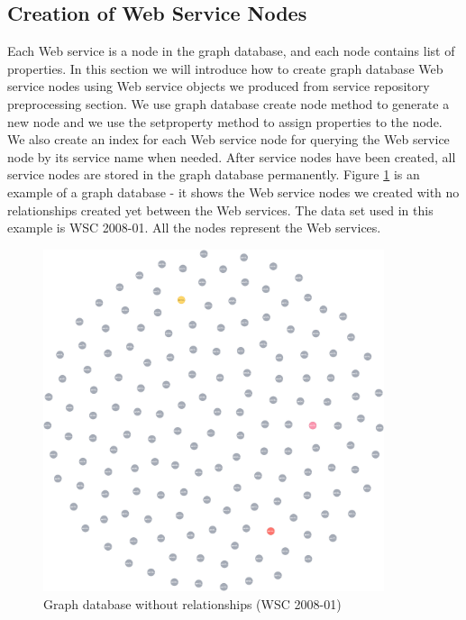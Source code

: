 \subsection{Creation of Web Service Nodes}
Each Web service is a node in the graph database, and each node contains list of properties. In this section we will introduce how to create graph database Web service nodes using Web service objects we produced from service repository preprocessing section. We use graph database create node method to generate a new node and we use the setproperty method to assign properties to the node. We also create an index for each Web service node for querying the Web service node by its service name when needed. After service nodes have been created, all service nodes are stored in the graph database permanently.  Figure \ref{fig:noRelationships} is an example of a graph database - it shows the Web service nodes we created with no relationships created yet between the Web services. The data set used in this example is WSC 2008-01. All the nodes represent the Web services. 
\begin{figure}[H]
\includegraphics[width=10cm]{service-without-relationships.png}
\centering
\caption{Graph database without relationships (WSC 2008-01)}
\label{fig:noRelationships} 
\end{figure} 
